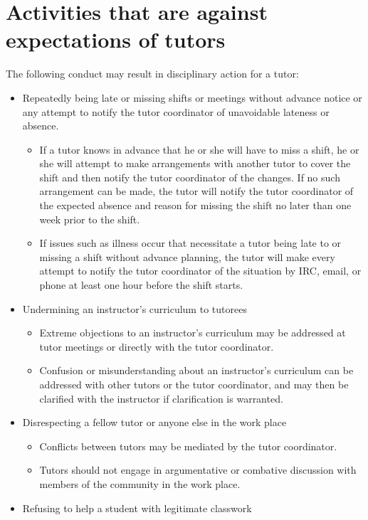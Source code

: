 \documentclass[12pt]{article}
\begin{document}
\section{Activities that are against expectations of tutors}
The following conduct may result in disciplinary action for a tutor:
\begin{itemize}
\item Repeatedly being late or missing shifts or meetings without advance 
notice or any attempt to notify the tutor coordinator of unavoidable 
lateness or absence.
	\begin{itemize}
	\item If a tutor knows in advance that he or she will have to miss
a shift, he or she will attempt to make arrangements with another 
tutor to cover the shift and then notify the tutor coordinator 
of the changes. If no such arrangement can be made, the 
tutor will notify the tutor coordinator of the expected absence and 
reason for missing the shift no later than one week prior to the shift. 
	\item If issues such as illness occur that necessitate a tutor being 
late to or missing a shift without advance planning, the tutor will 
make every attempt to notify the tutor coordinator of the situation
by IRC, email, or phone at least one hour before the shift starts.
\end{itemize}
\item Undermining an instructor's curriculum to tutorees
	\begin{itemize}
	\item Extreme objections to an instructor's curriculum may be addressed 
at tutor meetings or directly with the tutor coordinator.
	\item Confusion or misunderstanding about an instructor's curriculum
can be addressed with other tutors or the tutor coordinator, and may then 
be clarified with the instructor if clarification is warranted.
	\end{itemize}
\item Disrespecting a fellow tutor or anyone else in the work place 
\begin{itemize}
	\item Conflicts between tutors may be mediated by the tutor coordinator.
	\item Tutors should not engage in argumentative or combative discussion 
with members of the community in the work place. 
\end{itemize}
\item Refusing to help a student with legitimate classwork

\end{itemize}
\end{document}
